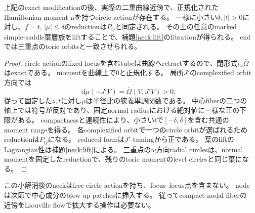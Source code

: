 \begin{proposition}\label{neck:actual}
上記のexact modificationの後、実際の二重曲線近傍で、正規化されたHamiltonian moment $\mu$を持つcircle actionが存在する。
一様に小さい$\delta,|t|>0$に対し、$f=t$, $|\mu|\le\delta$のreductionは$P_{ij}$と同定される。
その上の任意のmarked simple-saddle葉層族をliftすることで、補題\ref{neck:lift}のfibrationが得られる。
endでは三重点のtoric orbitsと一致させられる。
\end{proposition}
\begin{proof}
circle actionのfixed locusを含むtubeは曲線へretractするので、閉形式$\iota_V\bar\Omega$はexactである。
momentを曲線上で0と正規化する。
局所$J'$のcomplexified orbit方向では
\[
\mathrm d\mu(-J'V)=\bar\Omega(V,J'V)>0.
\]
従って固定した$z,t$に対し$\mu$は半径比の狭義単調関数である。
中心fiberの二つの軸上では符号が反対であり、固定normal radiusにおける絶対値に一様な正の下限がある。
compactnessと連続性により、小さい$t$で$[-\delta,\delta]$を含む共通のmoment rangeを得る。
各complexified orbitで一つのcircle orbitが選ばれるためreductionは$P_{ij}$になる。
reduced formは$J'$-tamingから正である。
葉のliftのLagrangian性は補題\ref{neck:lift}による。
三重点の$w$方向radial circlesは、normal momentを固定したreductionで、残りのtoric momentのlevel circlesと同じ葉になる。
\end{proof}

この小解消後のneckはfree circle actionを持ち、focus--focus点を含まない。
nodeは次節で中心成分のblow-up patchesに挿入する。
従ってcompact nodal fiberの近傍をLiouville flowで拡大する操作は必要ない。
